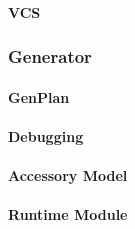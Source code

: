 \paragraph{\ac{VCS}}
\lipsum[5]

\subsubsection{Generator}
\lipsum[5]

\paragraph{GenPlan}
\lipsum[5]

\paragraph{Debugging}
\lipsum[5]

\paragraph{Accessory Model}
\lipsum[5]

\paragraph{Runtime Module}
\lipsum[5]
